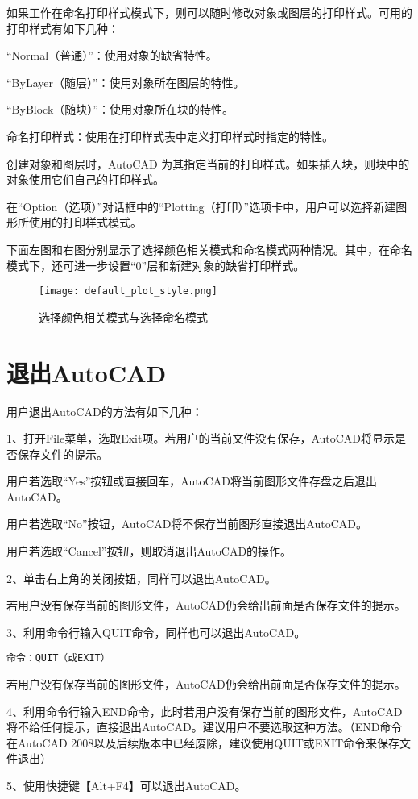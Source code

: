 如果工作在命名打印样式模式下，则可以随时修改对象或图层的打印样式。可用的打印样式有如下几种：

\begin{compactenum}
\item “Normal（普通）”：使用对象的缺省特性。
\item “ByLayer（随层）”：使用对象所在图层的特性。
\item “ByBlock（随块）”：使用对象所在块的特性。
\item 命名打印样式：使用在打印样式表中定义打印样式时指定的特性。
\end{compactenum}

创建对象和图层时，AutoCAD 为其指定当前的打印样式。如果插入块，则块中的对象使用它们自己的打印样式。

在“Option（选项）”对话框中的“Plotting（打印）”选项卡中，用户可以选择新建图形所使用的打印样式模式。

下面左图和右图分别显示了选择颜色相关模式和命名模式两种情况。其中，在命名模式下，还可进一步设置“0”层和新建对象的缺省打印样式。

\begin{figure}[htbp]
\centering
\texttt{[image: default\_plot\_style.png]}
\caption{选择颜色相关模式与选择命名模式}
\end{figure}

\chapter{退出AutoCAD}

用户退出AutoCAD的方法有如下几种：

1、打开File菜单，选取Exit项。若用户的当前文件没有保存，AutoCAD将显示是否保存文件的提示。

\begin{compactitem}
\item 用户若选取“Yes”按钮或直接回车，AutoCAD将当前图形文件存盘之后退出AutoCAD。
\item 用户若选取“No”按钮，AutoCAD将不保存当前图形直接退出AutoCAD。
\item 用户若选取“Cancel”按钮，则取消退出AutoCAD的操作。
\end{compactitem}

2、单击右上角的关闭按钮，同样可以退出AutoCAD。

若用户没有保存当前的图形文件，AutoCAD仍会给出前面是否保存文件的提示。

3、利用命令行输入QUIT命令，同样也可以退出AutoCAD。

\begin{verbatim}
命令：QUIT（或EXIT）
\end{verbatim}

若用户没有保存当前的图形文件，AutoCAD仍会给出前面是否保存文件的提示。

4、利用命令行输入END命令，此时若用户没有保存当前的图形文件，AutoCAD将不给任何提示，直接退出AutoCAD。建议用户不要选取这种方法。（END命令在AutoCAD 2008以及后续版本中已经废除，建议使用QUIT或EXIT命令来保存文件退出）

5、使用快捷键【Alt+F4】可以退出AutoCAD。


